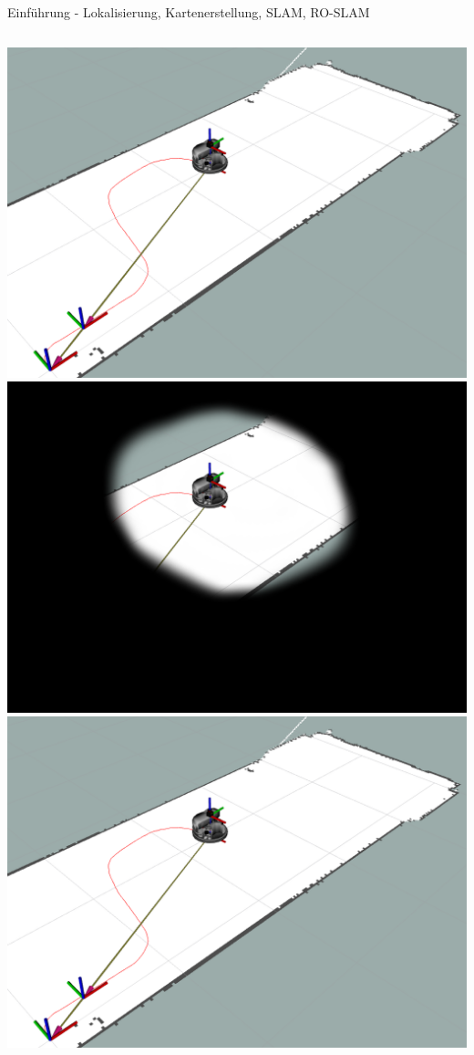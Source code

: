\documentclass{beamer}
\begin{document}
\begin{frame}{Einführung - Lokalisierung, Kartenerstellung, SLAM, RO-SLAM}
	\begin{columns}
		\begin{column}{0.5\linewidth}
			\begin{overlayarea}{\textwidth}{.35\textheight}
				\only<1>
				{
					\includegraphics[width=\linewidth]{intro_localization}
				}
				\only<2>
				{
					\includegraphics[width=\linewidth]{intro_mapping}
				}
				\only<3>
				{
					\includegraphics[width=\linewidth]{intro_localization}
}
\end{overlayarea}
\end{column}
\end{columns}
\end{frame}
\end{document}

